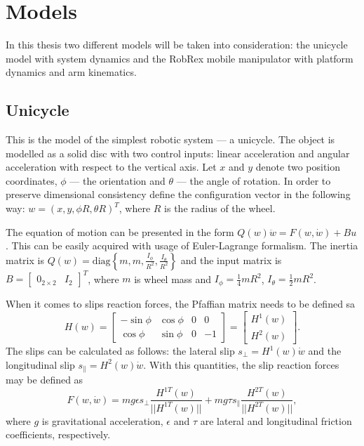 \chapter{Models}
\label{ch:model}
In this thesis two different models will be taken into consideration: the unicycle model with system dynamics and the RobRex mobile manipulator with platform dynamics and arm kinematics.
\section{Unicycle}
This is the model of the simplest robotic system --- a unicycle.
The object is modelled as a solid disc with two control inputs:
linear acceleration and angular acceleration with respect to the vertical axis.
Let $x$ and $y$ denote two position coordinates, $\phi$ --- the orientation
and $\theta$ --- the angle of rotation. 
In order to preserve dimensional consistency define the configuration vector in the following way:
$w = (x, y, \phi R, \theta R)^T$, where $R$ is the radius of the wheel.

The equation of motion can be presented
in the form $Q(w)\ddot w =F(w, \dot w)+Bu$. This can be easily acquired with usage of Euler-Lagrange formalism. The inertia matrix is $Q(w)=\mathrm{diag}\left\{m, m, \frac{I_\phi}{R^2}, \frac{I_\theta}{R^2}\right\}$ and the input matrix is $B=\begin{bmatrix}
0_{2 \times 2} & I_2
\end{bmatrix}^T$, where $m$ is wheel mass and $I_\phi=\frac{1}{4}mR^2$, $I_\theta=\frac{1}{2}mR^2$.

When it comes to slips reaction forces, the Pfaffian matrix needs to be defined sa
\begin{equation}
H(w)=\begin{bmatrix}
-\sin\phi & \cos\phi & 0 & 0\\
\cos\phi & \sin\phi & 0 & -1
\end{bmatrix}=\begin{bmatrix}
H^1(w)\\
H^2(w)
\end{bmatrix}.
\end{equation}
The slips can be calculated as follows: the lateral slip $s_\perp=H^1(w)\dot w$ and the longitudinal slip $s_\parallel=H^2(w)\dot w$. With this quantities, the slip reaction forces may be defined as 
\begin{equation}
F(w, \dot w)=mg\epsilon s_\perp\frac{H^{1T}(w)}{||H^{1T}(w)||} + mg\tau s_\parallel\frac{H^{2T}(w)}{||H^{2T}(w)||},
\end{equation}
where $g$ is gravitational acceleration, $\epsilon$ and $\tau$ are lateral and longitudinal friction coefficients, respectively.

